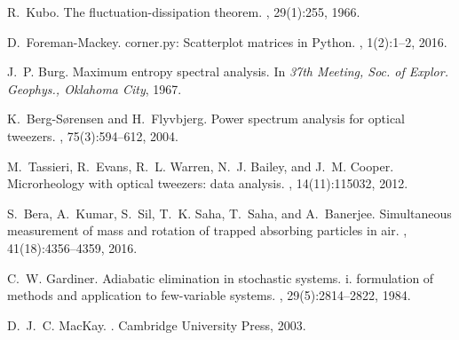 \documentclass[english,aps, twocolumn, pre,superscriptaddress, notitlepage]{revtex4-1}
\begin{document}
\begin{thebibliography}{10}
R.~Kubo.
\newblock The fluctuation-dissipation theorem.
, 29(1):255, 1966.

D.~Foreman-Mackey.
\newblock corner.py: Scatterplot matrices in {P}ython.
, 1(2):1--2, 2016.

J.~P. Burg.
\newblock Maximum entropy spectral analysis.
\newblock In {\em 37th Meeting, Soc. of Explor. Geophys., Oklahoma City}, 1967.

K.~Berg-S{\o}rensen and H.~Flyvbjerg.
\newblock Power spectrum analysis for optical tweezers.
, 75(3):594--612, 2004.

M.~Tassieri, R.~Evans, R.~L. Warren, N.~J. Bailey, and J.~M. Cooper.
\newblock Microrheology with optical tweezers: data analysis.
, 14(11):115032, 2012.

S.~Bera, A.~Kumar, S.~Sil, T.~K. Saha, T.~Saha, and A.~Banerjee.
\newblock Simultaneous measurement of mass and rotation of trapped absorbing
  particles in air.
, 41(18):4356--4359, 2016.

C.~W. Gardiner.
\newblock Adiabatic elimination in stochastic systems. i. formulation of
  methods and application to few-variable systems.
, 29(5):2814--2822, 1984.

D.~J.~C. MacKay.
.
\newblock Cambridge University Press, 2003.

\end{thebibliography}
\end{document}
